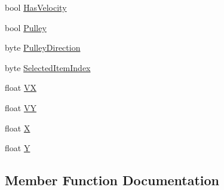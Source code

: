 \begin{DoxyCompactItemize}
bool \hyperlink{structOTA_1_1Plugin_1_1HookArgs_1_1StateUpdateReceived_ae9c043a2f0e7af5980b7804b78201c53}{Has\+Velocity}
\item 
bool \hyperlink{structOTA_1_1Plugin_1_1HookArgs_1_1StateUpdateReceived_a66e77b2eb7aac2bac39d7f7db40437b2}{Pulley}
\item 
byte \hyperlink{structOTA_1_1Plugin_1_1HookArgs_1_1StateUpdateReceived_a05632285aab7b37fbc05c032a33493b4}{Pulley\+Direction}
\item 
byte \hyperlink{structOTA_1_1Plugin_1_1HookArgs_1_1StateUpdateReceived_a9250451d2621cc862e36f5e8e3b0849b}{Selected\+Item\+Index}
\item 
float \hyperlink{structOTA_1_1Plugin_1_1HookArgs_1_1StateUpdateReceived_aae329f18607be0f3e5389238fc575e53}{V\+X}
\item 
float \hyperlink{structOTA_1_1Plugin_1_1HookArgs_1_1StateUpdateReceived_ad653c77fc56b2d99c36bb72d659622f2}{V\+Y}
\item 
float \hyperlink{structOTA_1_1Plugin_1_1HookArgs_1_1StateUpdateReceived_ab3c4b737dfc5c78a6aba50dda616f7c3}{X}
\item 
float \hyperlink{structOTA_1_1Plugin_1_1HookArgs_1_1StateUpdateReceived_ac915220fb659eb2c5958a1ccd81b80d4}{Y}
\end{DoxyCompactItemize}


\subsection{Member Function Documentation}
\hypertarget{structOTA_1_1Plugin_1_1HookArgs_1_1StateUpdateReceived_a854f31fd53049e109c2313dc47c54cca}{}
